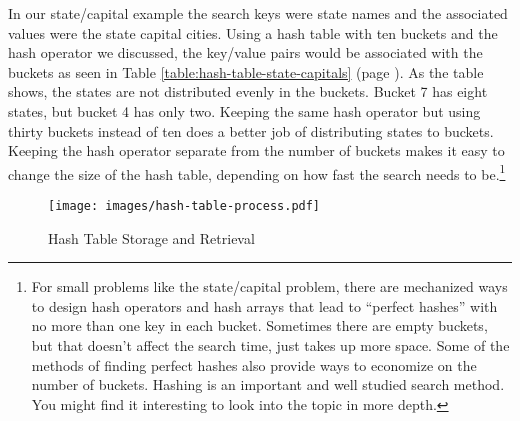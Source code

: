 In our state/capital example the search keys were state names and the
associated values were the state capital cities.
Using a hash table with ten buckets and the hash operator
we discussed, the key/value pairs would be associated with the
buckets as seen in 
Table \ref{table:hash-table-state-capitals}
(page \pageref{table:hash-table-state-capitals}).
As the table shows, the states are not distributed evenly in the
buckets. Bucket 7 has
eight states, but bucket 4 has only two.
Keeping the same hash operator but using thirty buckets
instead of ten does a better job of distributing states to buckets.
Keeping the hash operator separate from the number of buckets
makes it easy to change the size of the
hash table, depending on how fast the search needs
to be.\footnote{For small problems like the state/capital problem,
there are mechanized ways to design hash operators and
hash arrays that lead to ``perfect hashes'' with no
more than one key in each bucket. Sometimes there are
empty buckets, but that doesn't affect the search time,
just takes up more space. Some of the methods of
finding perfect hashes also provide ways to economize
on the number of buckets.
Hashing is an important and well studied search method.
You might find it interesting to look into the topic in more depth.}

\begin{figure}
\begin{center}
\texttt{[image: images/hash-table-process.pdf]}
\end{center}
\caption{Hash Table Storage and Retrieval}
\label{fig:hash-table-process}
\end{figure}

